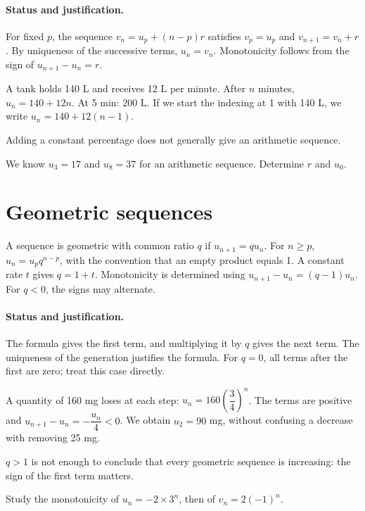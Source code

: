 \paragraph{Status and justification.} For fixed $p$, the sequence $v_n=u_p+(n-p)r$ satisfies $v_p=u_p$ and $v_{n+1}=v_n+r$. By uniqueness of the successive terms, $u_n=v_n$. Monotonicity follows from the sign of $u_{n+1}-u_n=r$.
\begin{example}A tank holds 140 L and receives 12 L per minute. After $n$ minutes, $u_n=140+12n$. At 5 min: 200 L. If we start the indexing at 1 with 140 L, we write $u_n=140+12(n-1)$.\end{example}\label{C01-EX2}
\begin{pitfall}Adding a constant percentage does not generally give an arithmetic sequence.\end{pitfall}
\begin{application}We know $u_3=17$ and $u_8=37$ for an arithmetic sequence. Determine $r$ and $u_0$.\end{application}\label{C01-AP2}
\section{Geometric sequences}\label{C01-U3}
\begin{keypoint}
A sequence is geometric with common ratio $q$ if $u_{n+1}=qu_n$. For $n\geq p$, $u_n=u_pq^{n-p}$, with the convention that an empty product equals 1. A constant rate $t$ gives $q=1+t$. Monotonicity is determined using $u_{n+1}-u_n=(q-1)u_n$. For $q<0$, the signs may alternate.
\end{keypoint}
\paragraph{Status and justification.} The formula gives the first term, and multiplying it by $q$ gives the next term. The uniqueness of the generation justifies the formula. For $q=0$, all terms after the first are zero; treat this case directly.
\begin{example}A quantity of 160 mg loses  at each step: $u_n=160(\dfrac{3}{4})^n$. The terms are positive and $u_{n+1}-u_n=-\dfrac{u_n}{4}<0$. We obtain $u_2=90$ mg, without confusing a  decrease with removing 25 mg.\end{example}\label{C01-EX3}
\begin{pitfall}$q>1$ is not enough to conclude that every geometric sequence is increasing: the sign of the first term matters.\end{pitfall}
\begin{application}Study the monotonicity of $u_n=-2\times3^n$, then of $v_n=2(-1)^n$.\end{application}\label{C01-AP3}
